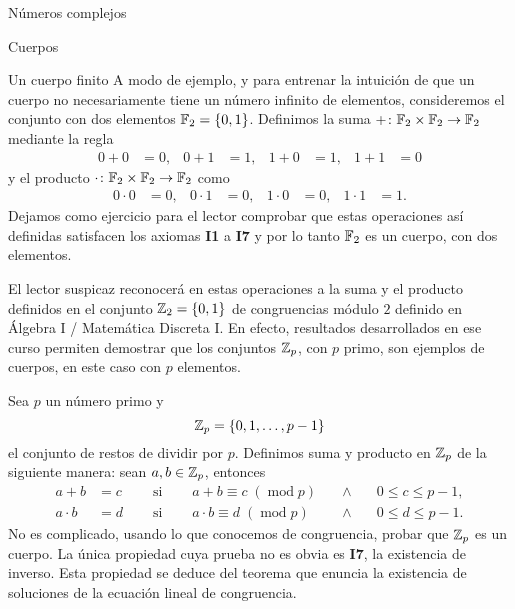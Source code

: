 \begin{chapter}{N\'umeros complejos}
\begin{section}{Cuerpos}
  \begin{subsection}{Un cuerpo finito}
      A modo de ejemplo, y para entrenar la intuición de que un cuerpo no necesariamente tiene un número infinito de elementos, consideremos el conjunto con dos elementos $\mathbb F_2=\{0,1\}$. Definimos la suma $+\colon\mathbb F_2\times \mathbb F_2\to \mathbb F_2$ mediante la regla
      \begin{align*}
          0+0 & =0, & 0+1 & =1, & 1+0 & =1, & 1+1 & =0
      \end{align*}
      y el producto $\cdot \colon\mathbb F_2\times \mathbb F_2\to \mathbb F_2$ como
      \begin{align*}
          0\cdot 0 & =0, & 0\cdot 1 & =0, & 1\cdot 0 & =0, & 1\cdot 1 & =1.
      \end{align*}
      Dejamos como ejercicio para el lector comprobar que estas operaciones así definidas satisfacen los axiomas \textbf{I1} a \textbf{I7} y por lo tanto $\mathbb F_2$ es un cuerpo, con dos elementos.

      \begin{observacion*}
          El lector suspicaz reconocerá en estas operaciones a la suma y el producto definidos en el conjunto $\mathbb Z_2=\{0,1\}$ de congruencias módulo $2$  definido en Álgebra I / Matemática Discreta I. En efecto, resultados desarrollados en ese curso permiten demostrar que los conjuntos $\mathbb Z_p$, con $p$ primo, son ejemplos de cuerpos, en este caso con $p$ elementos.
      \end{observacion*}

      \begin{ejemplo*}
          Sea $p$ un número primo y
          $$
              \mathbb Z_p = \{0,1,\ldots, p-1\}
          $$
          el conjunto de restos de dividir por $p$. Definimos suma y producto en $\mathbb Z_p$ de la siguiente manera: sean $a,b \in \mathbb Z_p$,  entonces
          \begin{equation*}
              \begin{array}{llllll}
                  a+b       & = c\quad & \text{ si }\quad & a+b \equiv c \; (\operatorname{mod}p) \quad & \wedge\quad & 0 \le c \le p-1, \\
                  a \cdot b & = d\quad & \text{ si }\quad & a\cdot b \equiv d \; (\operatorname{mod}p)  & \wedge      & 0 \le d \le p-1.
              \end{array}
          \end{equation*}
          No es complicado, usando lo que conocemos de congruencia, probar que $\mathbb Z_p$  es un cuerpo. La única propiedad cuya prueba no es obvia es  \textbf{I7}, la existencia de inverso. Esta propiedad se deduce del teorema que enuncia la existencia de soluciones  de la ecuación lineal de congruencia.
      \end{ejemplo*}


\end{subsection}
\end{section}
\end{chapter}
